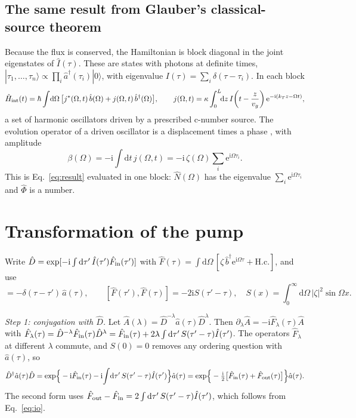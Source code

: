 \documentclass[aps,pra,onecolumn,notitlepage,11pt,amsmath,amssymb,nofootinbib]{revtex4-2}
\newcommand{\Nop}{\hat N}
\newcommand{\Iop}{\hat I}
\newcommand{\dd}{\mathrm{d}}
\newcommand{\ee}{\mathrm{e}}
\newcommand{\ii}{\mathrm{i}}
\begin{document}
\subsection{The same result from Glauber's classical-source theorem}

Because the flux is conserved, the Hamiltonian is block diagonal in the joint
eigenstates of $\Iop(\tau)$. These are states with photons at definite times,
$|\tau_1,\dots,\tau_n\rangle\propto\prod_i\hat a^\dagger(\tau_i)|0\rangle$,
with eigenvalue $I(\tau)=\sum_i\delta(\tau-\tau_i)$. In each block
\begin{equation}
\hat H_{\rm int}(t)=\hbar\int\!\dd\Omega\,\big[j^*(\Omega,t)\,\hat b(\Omega)
+j(\Omega,t)\,\hat b^\dagger(\Omega)\big],\qquad
j(\Omega,t)=\kappa\int_0^L\!\!\dd z\,I\!\left(t-\frac{z}{v_g}\right)
\ee^{-\ii(k_Tz-\Omega t)},
\end{equation}
a set of harmonic oscillators driven by a prescribed c-number source. The
evolution operator of a driven oscillator is a displacement times a phase
\cite{glauber1963}, with amplitude
\begin{equation}
\beta(\Omega)=-\ii\int\!\dd t\,j(\Omega,t)
=-\ii\,\zeta(\Omega)\sum_i\ee^{\ii\Omega\tau_i}.
\label{eq:beta}
\end{equation}
This is Eq.~\eqref{eq:result} evaluated in one block: $\Nop(\Omega)$ has the
eigenvalue $\sum_i\ee^{\ii\Omega\tau_i}$ and $\hat\Phi$ is a number.

\section{Transformation of the pump}

Write $\hat D=\exp[-\ii\int\dd\tau'\,\Iop(\tau')\hat F_{\rm in}(\tau')]$ with
$\hat F(\tau)=\int\dd\Omega\,[\zeta\,\hat b^\dagger\ee^{\ii\Omega\tau}
+\mathrm{H.c.}]$, and use
\begin{equation}
[\Iop(\tau'),\hat a(\tau)]=-\delta(\tau-\tau')\,\hat a(\tau),\qquad
[\hat F(\tau'),\hat F(\tau)]=-2\ii S(\tau'-\tau),\quad
S(x)=\int_0^\infty\!\!\dd\Omega\,|\zeta|^2\sin\Omega x .
\end{equation}

\emph{Step 1: conjugation with $\hat D$.} Let
$\hat A(\lambda)=\hat D^{-\lambda}\hat a(\tau)\hat D^{\lambda}$. Then
$\partial_\lambda\hat A=-\ii\hat F_\lambda(\tau)\hat A$ with
$\hat F_\lambda(\tau)=\hat D^{-\lambda}\hat F_{\rm in}(\tau)\hat D^{\lambda}
=\hat F_{\rm in}(\tau)+2\lambda\int\dd\tau'\,S(\tau'-\tau)\Iop(\tau')$. The
operators $\hat F_\lambda$ at different $\lambda$ commute, and $S(0)=0$ removes
any ordering question with $\hat a(\tau)$, so
\begin{equation}
\hat D^\dagger\hat a(\tau)\hat D=\exp\!\Big\{-\ii\hat F_{\rm in}(\tau)
-\ii\!\int\!\dd\tau'\,S(\tau'-\tau)\Iop(\tau')\Big\}\hat a(\tau)
=\exp\!\Big\{-\tfrac{\ii}{2}\big[\hat F_{\rm in}(\tau)+\hat F_{\rm out}(\tau)\big]\Big\}\hat a(\tau).
\end{equation}
The second form uses $\hat F_{\rm out}-\hat F_{\rm in}
=2\int\dd\tau'\,S(\tau'-\tau)\Iop(\tau')$, which follows from
Eq.~\eqref{eq:io}.
\end{document}
